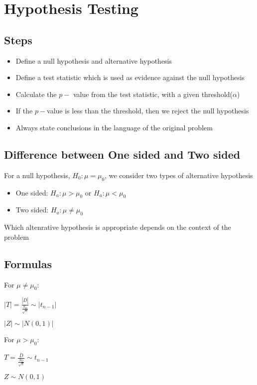 \chapter{Hypothesis Testing}
  \section{Steps}
    \begin{itemize}
      \item Define a null hypothesis and alternative hypothesis
      \item Define a test statistic which is used as evidence against the null hypothesis
      \item Calculate the $p-$ value from the test statistic, with a given threshold($\alpha$)
      \item If the $p-$value is less than the threshold, then we reject the null hypothesis
      \item Always state conclusions in the language of the original problem
    \end{itemize}

  \section{Difference between One sided and Two sided}
    For a null hypothesis, $H_0: \mu = \mu_0$, we consider two types of alternative hypothesis
    \begin{itemize}
      \item One sided: $H_a : \mu > \mu_0$ or $H_a : \mu < \mu_0$
      \item Two sided: $H_a : \mu \neq \mu_0$
    \end{itemize}
    Which altenrative hypothesis is appropriate depends on the context of the problem

  \section{Formulas}
    For $\mu \neq \mu_0$:
    \begin{center}$ |T| = \frac{|\bar{D}|}{\frac{S_D}{\sqrt{n}}} \sim |t_{n-1}| $\end{center}
    \begin{center}$ |Z| \sim |N(0, 1)| $\end{center}

    For $\mu > \mu_0$:
    \begin{center}$ T = \frac{\bar{D}}{\frac{S_D}{\sqrt{n}}} \sim t_{n-1} $\end{center}
    \begin{center}$ Z \sim N(0, 1) $\end{center}

